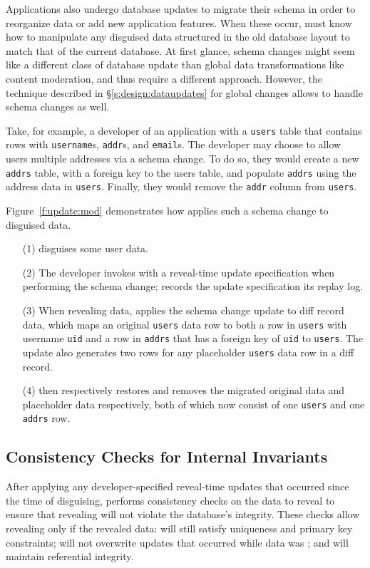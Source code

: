 %
Applications also undergo database updates to migrate their schema in
order to reorganize data or add new application features. When these occur, \sys
must know how to manipulate any disguised data structured in the old database
layout to match that of the current database.
%
At first glance, schema changes might seem like a different class of
database update than global data transformations like content moderation, and
thus require a different approach.
%
However, the technique described in \S\ref{s:design:dataupdates} for global 
changes allows \sys to handle schema changes as well. 
%

%
Take, for example, a developer of an application with a \texttt{users} table
that contains rows with \texttt{username}s, \texttt{addr}s, and \texttt{email}s.
The developer may choose to allow users multiple addresses via a schema
change. To do so, they would create a new \texttt{addrs} table, with a
foreign key to the users table, and populate \texttt{addrs} using the address
data in \texttt{users}.  Finally, they would remove the \texttt{addr} column
from \texttt{users}.
%

Figure~\ref{f:update:mod} demonstrates how \sys applies such a schema change 
to disguised data.  \begin{enumerate}[nosep]
    \item[(1)] \sys disguises some user data.
    \item[(2)] The developer invokes \sys with a reveal-time update
        specification when 
performing the schema change; \sys records the update specification its replay log.
    \item[(3)] When revealing data, \sys applies the schema change update
        to diff record data, which maps an original \texttt{users} data row to
        both
    a row in \texttt{users} with username \texttt{uid} and a row in
\texttt{addrs} that has a foreign key of \texttt{uid} to \texttt{users}.
%
The update also generates two rows for any placeholder \texttt{users}
data row in a diff record.
%
\item[(4)] \sys then respectively restores and removes the migrated original data and placeholder
        data respectively, both of which now consist of one \texttt{users} and
        one \texttt{addrs} row.
\end{enumerate}

\subsection{Consistency Checks for Internal Invariants} 
After applying any developer-specified reveal-time updates that occurred since
the time of disguising, \sys performs consistency checks on the data to reveal
to ensure that revealing will not violate the database's integrity.
%
These checks allow revealing only if the revealed data: \one{} will still
satisfy uniqueness and primary key constraints; \two{} will not overwrite
updates that occurred while data was \xxed; and \three{} will maintain
referential integrity.

